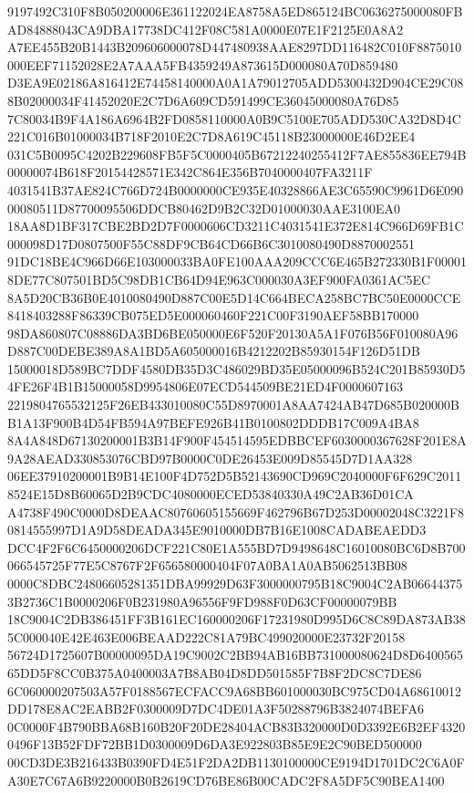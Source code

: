 \documentclass[UTF8,fontset=fandol,zihao=-4,a4paper]{ctexart}
\begin{document}
{{9197492C310F8B050200006E361122024EA8758A5ED865124BC0636275000080FBAD84888043CA9DBA17738DC412F08C581A0000E07E1F2125E0A8A2
A7EE455B20B1443B209606000078D447480938AAE8297DD116482C010F8875010000EEF71152028E2A7AAA5FB4359249A873615D000080A70D859480
D3EA9E02186A816412E74458140000A0A1A79012705ADD5300432D904CE29C088B02000034F41452020E2C7D6A609CD591499CE36045000080A76D85
7C80034B9F4A186A6964B2FD0858110000A0B9C5100E705ADD530CA32D8D4C221C016B01000034B718F2010E2C7D8A619C45118B23000000E46D2EE4
031C5B0095C4202B229608FB5F5C0000405B67212240255412F7AE855836EE794B00000074B618F20154428571E342C864E356B7040000407FA3211F
4031541B37AE824C766D724B0000000CE935E40328866AE3C65590C9961D6E09000080511D87700095506DDCB80462D9B2C32D01000030AAE3100EA0
18AA8D1BF317CBE2BD2D7F0000606CD3211C4031541E372E814C966D69FB1C000098D17D0807500F55C88DF9CB64CD66B6C3010080490D8870002551
91DC18BE4C966D66E103000033BA0FE100AAA209CCC6E465B272330B1F000018DE77C807501BD5C98DB1CB64D94E963C000030A3EF900FA0361AC5EC
8A5D20CB36B0E4010080490D887C00E5D14C664BECA258BC7BC50E0000CCE8418403288F86339CB075ED5E000060460F221C00F3190AEF58BB170000
98DA860807C08886DA3BD6BE050000E6F520F20130A5A1F076B56F010080A96D887C00DEBE389A8A1BD5A605000016B4212202B85930154F126D51DB
15000018D589BC7DDF4580DB35D3C486029BD35E05000096B524C201B85930D54FE26F4B1B15000058D9954806E07ECD544509BE21ED4F0000607163
2219804765532125F26EB433010080C55D8970001A8AA7424AB47D685B020000BB1A13F900B4D54FB594A97BEFE926B41B0100802DDDB17C009A4BA8
8A4A848D67130200001B3B14F900F454514595EDBBCEF6030000367628F201E8A9A28AEAD330853076CBD97B0000C0DE26453E009D85545D7D1AA328
06EE37910200001B9B14E100F4D752D5B52143690CD969C2040000F6F629C20118524E15D8B60065D2B9CDC4080000ECED53840330A49C2AB36D01CA
A4738F490C0000D8DEAAC80760605155669F462796B67D253D00002048C3221F80814555997D1A9D58DEADA345E9010000DB7B16E1008CADABEAEDD3
DCC4F2F6C6450000206DCF221C80E1A555BD7D9498648C16010080BC6D8B700066545725F77E5C8767F2F656580000404F07A0BA1A0AB5062513BB08
0000C8DBC24806605281351DBA99929D63F3000000795B18C9004C2AB066443753B2736C1B0000206F0B231980A96556F9FD988F0D63CF00000079BB
18C9004C2DB386451FF3B161EC160000206F17231980D995D6C8C89DA873AB385C000040E42E463E006BEAAD222C81A79BC499020000E23732F20158
56724D1725607B00000095DA19C9002C2BB94AB16BB731000080624D8D640056565DD5F8CC0B375A0400003A7B8AB04D8DD501585F7B8F2DC8C7DE86
6C060000207503A57F0188567ECFACC9A68BB601000030BC975CD04A68610012DD178E8AC2EABB2F0300009D7DC4DE01A3F50288796B3824074BEFA6
0C0000F4B790BBA68B160B20F20DE28404ACB83B320000D0D3392E6B2EF43200496F13B52FDF72BB1D0300009D6DA3E922803B85E9E2C90BED500000
00CD3DE3B216433B0390FD4E51F2DA2DB1130100000CE9194D1701DC2C6A0FA30E7C67A6B9220000B0B2619CD76BE86B00CADC2F8A5DF5C90BEA1400
}}
\end{document}
